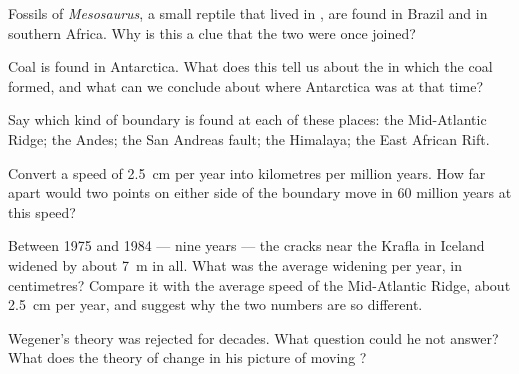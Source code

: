\begin{exercise}[$\star$]\label{exo:g7:plate-tectonics:4}
Fossils of \emph{Mesosaurus}, a small reptile that lived in ,
are found in Brazil and in southern Africa. Why is this a clue that the two
 were once joined?
\end{exercise}

\begin{exercise}[$\star\star$]\label{exo:g7:plate-tectonics:5}
Coal is found in Antarctica. What does this tell us about the  in
which the coal formed, and what can we conclude about where Antarctica was
at that time?
\end{exercise}

\begin{exercise}[$\star\star$]\label{exo:g7:plate-tectonics:6}
Say which kind of boundary is found at each of these places: the
Mid-Atlantic Ridge; the Andes; the San Andreas fault; the Himalaya; the
East African Rift.
\end{exercise}

\begin{exercise}[$\star\star$]\label{exo:g7:plate-tectonics:7}
Convert a speed of \qty{2.5}{cm} per year into kilometres per million
years. How far apart would two points on either side of the boundary move
in 60 million years at this speed?
\end{exercise}

\begin{exercise}[$\star\star$]\label{exo:g7:plate-tectonics:8}
Between 1975 and 1984 --- nine years --- the cracks near the Krafla 
in Iceland widened by about \qty{7}{m} in all. What was the average
widening per year, in centimetres? Compare it with the average speed of
the Mid-Atlantic Ridge, about \qty{2.5}{cm} per year, and suggest why the
two numbers are so different.
\end{exercise}

\begin{exercise}[$\star\star$]\label{exo:g7:plate-tectonics:9}
Wegener's theory was rejected for decades. What question could he not
answer? What does the theory of  change in his picture of
moving ?
\end{exercise}

